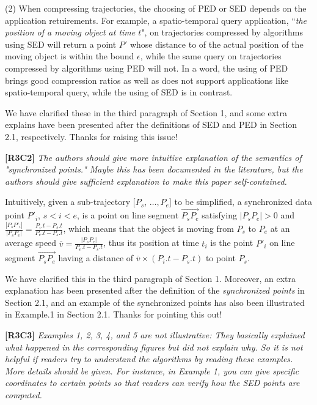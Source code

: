 \documentclass{letter}
\begin{document}
(2) When compressing trajectories, the choosing of PED or SED depends on the application retuirements. For example, a spatio-temporal query application, ``\emph{the position of a moving object at time $t$}", on trajectories compressed by algorithms using SED will return a point $P'$ whose distance to of the actual position of the moving object is within the bound $\epsilon$, while the same query on trajectories compressed by algorithms using PED will not. In a word, the using of PED brings good compression ratios as well as does not support applications like spatio-temporal query, while the using of SED is in contrast.

We have clarified these in the third paragraph of Section 1, and some extra explains have been presented after the definitions of SED and PED in Section 2.1, respectively. Thanks for raising this issue!

\textbf{[R3C2]} \emph{The authors should give more intuitive explanation of the semantics of "synchronized points." Maybe this has been documented in the literature, but the authors should give sufficient explanation to make this paper self-contained.}

Intuitively, given a sub-trajectory $[P_s$, $\ldots, P_e]$ to be simplified, a synchronized data point $P'_i$, $s<i<e$, is a point on line segment $\overrightarrow{P_sP_{e}}$ satisfying $|P_sP_e|>0$ and $\frac{|P_sP'_i|}{|P_sP_e|} = \frac{P_i.t - P_s.t}{P_e.t-P_s.t}$, which means that the object is moving from $P_s$ to $P_e$ at an average speed $\overline{v} = \frac{|P_sP_e|}{P_e.t-P_s.t}$, thus its position at time $t_i$ is the point $P'_i$ on line segment $\overrightarrow{P_sP_{e}}$ having a distance of $\overline{v}\times (P_i.t-P_s.t)$ to point $P_s$.

We have clarified this in the third paragraph of Section 1. Moreover, an extra explanation has been presented after the definition of the \emph{synchronized points} in Section 2.1, and an example of the synchronized points has also been illustrated in Example.1 in Section 2.1.
Thanks for pointing this out!



\textbf{[R3C3]} \emph{Examples 1, 2, 3, 4, and 5 are not illustrative: They basically explained what happened in the corresponding figures but did not explain why. So it is not helpful if readers try to understand the algorithms by reading these examples. More details should be given. For instance, in Example 1, you can give specific coordinates to certain points so that readers can verify how the SED points are computed.}
\end{document}
